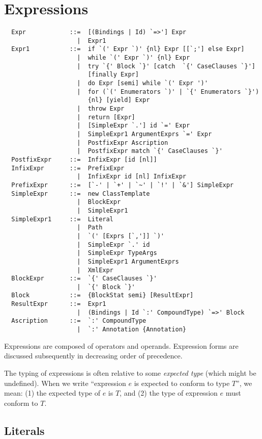 \chapter{Expressions}
\label{sec:exprs}

\syntax\begin{lstlisting}
  Expr            ::=  [(Bindings | Id) `=>'] Expr
                    |  Expr1
  Expr1           ::=  if `(' Expr `)' {nl} Expr [[`;'] else Expr]
                    |  while `(' Expr `)' {nl} Expr
                    |  try `{' Block `}' [catch  `{' CaseClauses `}'] 
                       [finally Expr]
                    |  do Expr [semi] while `(' Expr ')'
                    |  for (`(' Enumerators `)' | `{' Enumerators `}') 
                       {nl} [yield] Expr
                    |  throw Expr
                    |  return [Expr]
                    |  [SimpleExpr `.'] id `=' Expr
                    |  SimpleExpr1 ArgumentExprs `=' Expr
                    |  PostfixExpr Ascription
                    |  PostfixExpr match `{' CaseClauses `}'
  PostfixExpr     ::=  InfixExpr [id [nl]]
  InfixExpr       ::=  PrefixExpr
                    |  InfixExpr id [nl] InfixExpr
  PrefixExpr      ::=  [`-' | `+' | `~' | `!' | `&'] SimpleExpr 
  SimpleExpr      ::=  new ClassTemplate
                    |  BlockExpr
                    |  SimpleExpr1
  SimpleExpr1     ::=  Literal
                    |  Path
                    |  `(' [Exprs [`,']] `)'
                    |  SimpleExpr `.' id 
                    |  SimpleExpr TypeArgs
                    |  SimpleExpr1 ArgumentExprs
                    |  XmlExpr
  BlockExpr       ::=  `{' CaseClauses `}'
                    |  `{' Block `}'
  Block           ::=  {BlockStat semi} [ResultExpr]
  ResultExpr      ::=  Expr1
                    |  (Bindings | Id `:' CompoundType) `=>' Block
  Ascription      ::=  `:' CompoundType
                    |  `:' Annotation {Annotation} 
\end{lstlisting}

Expressions are composed of operators and operands. Expression forms are
discussed subsequently in decreasing order of precedence. 

The typing of expressions is often relative to some {\em expected
type} (which might be undefined).  
When we write ``expression $e$ is expected to conform to
type $T$'', we mean: (1) the expected type of $e$ is
$T$, and (2) the type of expression $e$ must conform to
$T$.

\section{Literals}\label{sec:literal-exprs}

